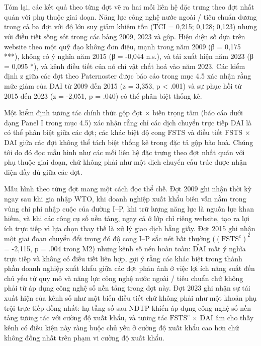 \documentclass[12pt,a4paper]{article}
\begin{document}
Tóm lại, các kết quả theo từng đợt vẽ ra hai mối liên hệ đặc trưng theo
đợt nhất quán với phụ thuộc giai đoạn. Năng lực công nghệ nước ngoài /
tiêu chuẩn dương trong cả ba đợt với độ lớn suy giảm khiêm tốn
(\(\tilde{\mathrm{TCI}}\) = 0,215; 0,128; 0,123) nhưng với điều tiết
sống sót trong các bảng 2009, 2023 và gộp. Hiện diện số dựa trên website
theo một quỹ đạo không đơn điệu, mạnh trong năm 2009 (β = 0,175 ***),
không có ý nghĩa năm 2015 (β = -0,044 n.s.), và tái xuất hiện năm 2023
(β = 0,095 *), và kênh điều tiết của nó chỉ vật chất hoá vào năm 2023.
Các kiểm định z giữa các đợt theo Paternoster được báo cáo trong mục 4.5
xác nhận rằng mức giảm của DAI từ 2009 đến 2015 (z = 3,353, p
\textless{} .001) và sự phục hồi từ 2015 đến 2023 (z = -2,051, p = .040)
có thể phân biệt thống kê.

Một kiểm định tương tác chính thức gộp đợt × biến trọng tâm (báo cáo
dưới dạng Panel I trong mục 4.5) xác nhận rằng chỉ các dịch chuyển trực
tiếp DAI là có thể phân biệt giữa các đợt; các khác biệt độ cong FSTS và
điều tiết FSTS × DAI giữa các đợt không thể tách biệt thống kê trong đặc
tả gộp bão hoà. Chúng tôi do đó đọc mẫu hình như các mối liên hệ đặc
trưng theo đợt nhất quán với phụ thuộc giai đoạn, chứ không phải như một
dịch chuyển cấu trúc được nhận diện đầy đủ giữa các đợt.

Mẫu hình theo từng đợt mang một cách đọc thể chế. Đợt 2009 ghi nhận thời
kỳ ngay sau khi gia nhập WTO, khi doanh nghiệp xuất khẩu biên vẫn nằm
trong vùng chi phí nhập cuộc của đường I--P, khi trữ lượng năng lực là
nguồn lực khan hiếm, và khi các công cụ số nền tảng, ngay cả ở lớp chỉ
riêng website, tạo ra lợi ích trực tiếp vì lựa chọn thay thế là xử lý
giao dịch bằng giấy. Đợt 2015 ghi nhận một giai đoạn chuyển đổi trong đó
độ cong I--P sắc nét bất thường (\((\mathrm{FSTS}^{c})^2\) = -2,115, p =
.004 trong M2) nhưng kênh số nén hoàn toàn: \(\tilde{\mathrm{DAI}}\) mất
ý nghĩa trực tiếp và không có điều tiết liên hợp, gợi ý rằng các khác
biệt trong thành phần doanh nghiệp xuất khẩu giữa các đợt phản ánh ở
việc lợi ích năng suất đến chủ yếu từ quy mô và năng lực công nghệ nước
ngoài / tiêu chuẩn chứ không phải từ áp dụng công nghệ số nền tảng trong
đợt này. Đợt 2023 ghi nhận sự tái xuất hiện của kênh số như một biến
điều tiết chứ không phải như một khoản phụ trội trực tiếp đồng nhất: hạ
tầng số sau NDTP khiến áp dụng công nghệ số nền tảng tương tác với cường
độ xuất khẩu, và tương tác \(\mathrm{FSTS}^{c}\) ×
\(\tilde{\mathrm{DAI}}\) âm cho thấy kênh có điều kiện này ràng buộc chủ
yếu ở cường độ xuất khẩu cao hơn chứ không đồng nhất trên phạm vi cường
độ xuất khẩu.
\end{document}
